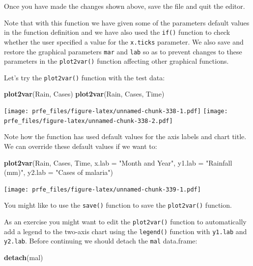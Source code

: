 \documentclass[12pt,a4paper]{book}
\newenvironment{Shaded}{\begin{snugshade}}{\end{snugshade}}
\newcommand{\KeywordTok}[1]{\textcolor[rgb]{0.13,0.29,0.53}{\textbf{#1}}}
\newcommand{\DataTypeTok}[1]{\textcolor[rgb]{0.13,0.29,0.53}{#1}}
\newcommand{\StringTok}[1]{\textcolor[rgb]{0.31,0.60,0.02}{#1}}
\newcommand{\NormalTok}[1]{#1}
\theoremstyle{definition}
\theoremstyle{definition}
\theoremstyle{definition}
\theoremstyle{remark}
\begin{document}
Once you have made the changes shown above, save the file and quit the
editor.

Note that with this function we have given some of the parameters
default values in the function definition and we have also used the
\texttt{if()} function to check whether the user specified a value for
the \texttt{x.ticks} parameter. We also save and restore the graphical
parameters \texttt{mar} and \texttt{lab} so as to prevent changes to
these parameters in the \texttt{plot2var()} function affecting other
graphical functions.

Let's try the \texttt{plot2var()} function with the test data:

\begin{Shaded}
\begin{Highlighting}[]
\KeywordTok{plot2var}\NormalTok{(Rain, Cases)}
\KeywordTok{plot2var}\NormalTok{(Rain, Cases, Time)}
\end{Highlighting}
\end{Shaded}

\texttt{[image: prfe\_files/figure-latex/unnamed-chunk-338-1.pdf]}
\texttt{[image: prfe\_files/figure-latex/unnamed-chunk-338-2.pdf]}

Note how the function has used default values for the axis labels and
chart title. We can override these default values if we want to:

\begin{Shaded}
\begin{Highlighting}[]
\KeywordTok{plot2var}\NormalTok{(Rain, Cases, Time, }\DataTypeTok{x.lab =} \StringTok{"Month and Year"}\NormalTok{,}
         \DataTypeTok{y1.lab =} \StringTok{"Rainfall (mm)"}\NormalTok{, }\DataTypeTok{y2.lab =} \StringTok{"Cases of malaria"}\NormalTok{)}
\end{Highlighting}
\end{Shaded}

\texttt{[image: prfe\_files/figure-latex/unnamed-chunk-339-1.pdf]}

You might like to use the \texttt{save()} function to save the
\texttt{plot2var()} function.

As an exercise you might want to edit the \texttt{plot2var()} function
to automatically add a legend to the two-axis chart using the
\texttt{legend()} function with \texttt{y1.lab} and \texttt{y2.lab}.
Before continuing we should detach the \texttt{mal} data.frame:

\begin{Shaded}
\begin{Highlighting}[]
\KeywordTok{detach}\NormalTok{(mal)}
\end{Highlighting}
\end{Shaded}
\end{document}
